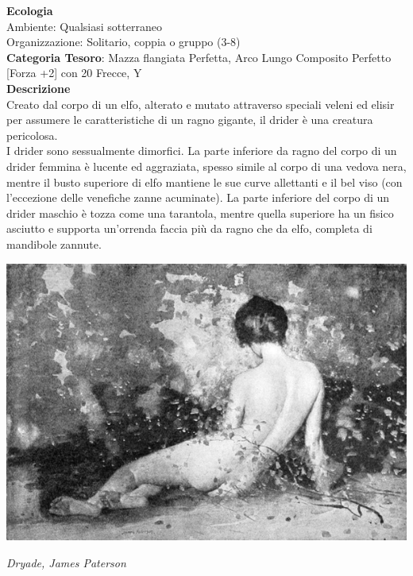 \begin{multicols}{2}
{\textbf{Ecologia}\\
Ambiente: Qualsiasi sotterraneo\\
Organizzazione: Solitario, coppia o gruppo (3-8)\\
\textbf{Categoria Tesoro}: Mazza flangiata Perfetta, Arco Lungo Composito Perfetto [Forza +2] con 20 Frecce, Y\\
\textbf{Descrizione}\\
Creato dal corpo di un elfo, alterato e mutato attraverso speciali veleni ed elisir per assumere le caratteristiche di un ragno gigante, il drider è una creatura pericolosa.\\
I drider sono sessualmente dimorfici. La parte inferiore da ragno del corpo di un drider femmina è lucente ed aggraziata, spesso simile al corpo di una vedova nera, mentre il busto superiore di elfo mantiene le sue curve allettanti e il bel viso (con l'eccezione delle venefiche zanne acuminate). La parte inferiore del corpo di un drider maschio è tozza come una tarantola, mentre quella superiore ha un fisico asciutto e supporta un'orrenda faccia più da ragno che da elfo, completa di mandibole zannute.


\begin{center}
	\includegraphics[width=0.9\linewidth]{immagini/James_Paterson_-_Dryade.png}

	\emph{Dryade, James Paterson}
\end{center}

}
\end{multicols}
